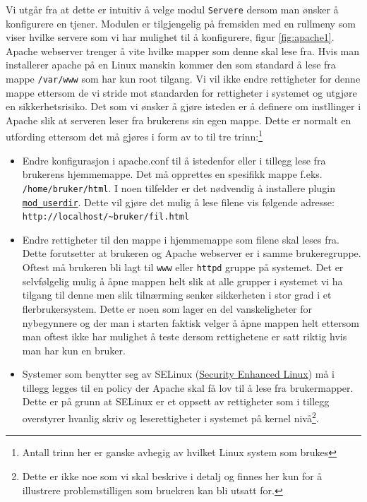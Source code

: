 Vi utgår fra at dette er intuitiv å velge modul \texttt{Servere} dersom man ønsker å konfigurere en tjener. Modulen er tilgjengelig på fremsiden med en rullmeny som viser hvilke servere som vi har mulighet til å konfigurere, figur \ref{fig:apache1}. 
Apache webserver trenger å vite hvilke mapper som denne skal lese fra. Hvis man installerer apache på en Linux manskin kommer den som standard å lese fra mappe \texttt{/var/www} som har kun root tilgang. Vi vil ikke endre rettigheter for denne mappe ettersom de vi stride mot standarden for rettigheter i systemet og utgjøre en sikkerhetsrisiko.\cite{book:unixprog}
Det som vi ønsker å gjøre isteden er å definere om instllinger i Apache slik at serveren leser fra brukerens sin egen mappe. Dette er normalt en utfording ettersom det må gjøres i form av to til tre trinn:\footnote{Antall trinn her er ganske avhegig av hvilket Linux system som brukes}

\begin{itemize}
\item Endre konfigurasjon i apache.conf til å istedenfor eller i tillegg lese fra brukerens hjemmemappe. Det må opprettes en spesifikk mappe f.eks. \texttt{/home/bruker/html}. 
I noen tilfelder er det nødvendig å installere plugin \href{http://httpd.apache.org/docs/2.2/mod/mod_userdir.html}{\texttt{mod\_{}userdir}}. Dette vil gjøre det mulig å lese filene vis følgende adresse: \texttt{http://localhost/\~{}bruker/fil.html}

\item Endre rettigheter til den mappe i hjemmemappe som filene skal leses fra. Dette forutsetter at brukeren og Apache webserver er i samme brukeregruppe. Oftest må brukeren bli lagt til \texttt{www} eller \texttt{httpd} gruppe på systemet. Det er selvfølgelig mulig å åpne mappen helt slik at alle grupper i systemet vi ha tilgang til denne men slik tilnærming senker sikkerheten i stor grad i et flerbrukersystem. Dette er noen som lager en del vanskeligheter for nybegynnere og der man i starten faktisk velger å åpne mappen helt ettersom man oftest ikke har mulighet å teste dersom rettighetene er satt riktig hvis man har kun en bruker.

\item Systemer som benytter seg av SELinux (\href{http://en.wikipedia.org/wiki/Security-Enhanced_Linux}{Security Enhanced Linux}) må i tillegg legges til en policy der Apache skal få lov til å lese fra brukermapper. Dette er på grunn at SELinux er et oppsett av rettigheter som i tillegg overstyrer hvanlig skriv og leserettigheter i systemet på kernel nivå\footnote{Dette er ikke noe som vi skal beskrive i detalj og finnes her kun for å illustrere problemstilligen som bruekren kan bli utsatt for.}. 
\end{itemize}

